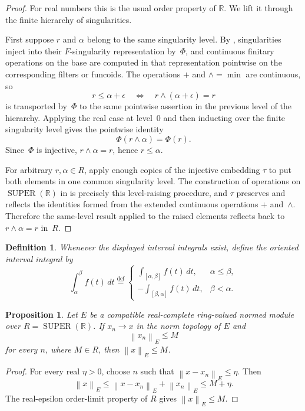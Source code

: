 \documentclass{amsart}
\newtheorem{prop}{Proposition}
\newtheorem{defn}{Definition}
\DeclareMathOperator{\SUPER}{SUPER}
\newcommand{\eqdef}{\overset{\mathrm{def}}{=}}
\newcommand{\norm}[1]{\left\lVert #1\right\rVert}
\begin{document}
\begin{proof}
For real numbers this is the usual order property of $\mathbb{R}$.  We lift it
through the finite hierarchy of singularities.

First suppose $r$ and $\alpha$ belong to the same singularity level.  By
\cite[pp.~6--8]{limit}, singularities inject into their $F$-singularity
representation by~$\Phi$, and continuous finitary operations on the base are
computed in that representation pointwise on the corresponding filters or
funcoids.  The operations $+$ and $\wedge=\min$ are continuous, so
\[
  r\leq\alpha+\epsilon
  \quad\Longleftrightarrow\quad
  r\wedge(\alpha+\epsilon)=r
\]
is transported by~$\Phi$ to the same pointwise assertion in the previous
level of the hierarchy.  Applying the real case at level~$0$ and then
inducting over the finite singularity level gives the pointwise identity
\[
  \Phi(r\wedge\alpha)=\Phi(r).
\]
Since~$\Phi$ is injective, $r\wedge\alpha=r$, hence $r\leq\alpha$.

For arbitrary $r,\alpha\in R$, apply enough copies of the injective embedding
$\tau$ to put both elements in one common singularity level.  The construction
of operations on $\SUPER(\mathbb{R})$ in \cite[section~9]{limit} is precisely
this level-raising procedure, and $\tau$ preserves and reflects the identities
formed from the extended continuous operations $+$ and~$\wedge$.  Therefore
the same-level result applied to the raised elements reflects back to
$r\wedge\alpha=r$ in~$R$.
\end{proof}

\begin{defn}
Whenever the displayed interval integrals exist, define the oriented interval
integral by
\[
  \int_\alpha^\beta f(t)\,dt
  \eqdef
  \begin{cases}
    \int_{[\alpha,\beta]} f(t)\,dt,& \alpha\leq\beta,\\
    -\int_{[\beta,\alpha]} f(t)\,dt,& \beta<\alpha.
  \end{cases}
\]
\end{defn}

\begin{prop}
Let $E$ be a compatible real-complete ring-valued normed module over
$R=\SUPER(\mathbb{R})$.  If $x_n\to x$ in the norm topology of $E$ and
\[
  \norm{x_n}_E\leq M
\]
for every $n$, where $M\in R$, then $\norm{x}_E\leq M$.
\end{prop}

\begin{proof}
For every real $\eta>0$, choose $n$ such that
$\norm{x-x_n}_E\leq\eta$.  Then
\[
  \norm{x}_E\leq\norm{x-x_n}_E+\norm{x_n}_E\leq M+\eta .
\]
The real-epsilon order-limit property of $R$ gives $\norm{x}_E\leq M$.
\end{proof}
\end{document}

